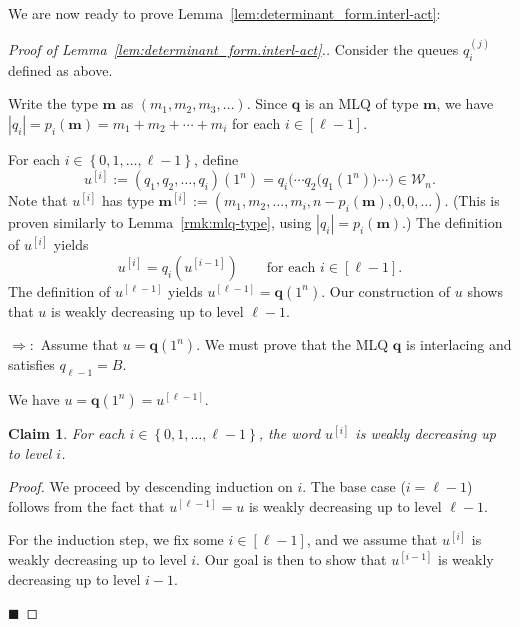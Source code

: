\documentclass[reqno]{amsart}
\newcommand{\0}{\phantom{c}}
\newcommand{\mm}{\mathbf{m}}
\newcommand{\qq}{\mathbf{q}}
\newcommand{\mcW}{\mathcal{W}}
\newenvironment{subproof}{\textit{Proof.} }{\hfill$\blacksquare$ \medskip}
\newcommand{\set}[1]{\left\{ #1 \right\}}
\newcommand{\abs}[1]{\left| #1 \right|}
\newcommand{\tup}[1]{\left( #1 \right)}
\newcommand{\ive}[1]{\left[ #1 \right]}
\theoremstyle{plain}
\newtheorem{claim}[thm]{Claim}
\theoremstyle{definition}
\numberwithin{equation}{section}
\begin{document}
We are now ready to prove Lemma~\ref{lem:determinant_form.interl-act}:

\begin{proof}[Proof of Lemma~\ref{lem:determinant_form.interl-act}.]
Consider the queues $q_i^{(j)}$ defined as above.

Write the type $\mm$ as $\tup{m_1, m_2, m_3, \ldots}$.
Since $\qq$ is an MLQ of type $\mm$, we have $\abs{q_i} = p_i(\mm) = m_1 + m_2 + \cdots + m_i$ for each $i \in \ive{\ell-1}$.

For each $i \in \set{0, 1, \dotsc, \ell-1}$, define
\[
u^{\left[  i\right]} := (q_1, q_2, \dotsc, q_i)(1^n)  = q_i\bigl( \cdots q_2\bigl( q_1(1^n) \bigr) \cdots \bigr)  \in \mcW_n .
\]
Note that $u^{\left[  i\right]  }$ has type $\mm^{[i]} := \tup{m_1, m_2, \dotsc, m_i, n-p_i(\mm), 0, 0, \ldots}$.
(This is proven similarly to Lemma~\ref{rmk:mlq-type}, using $\abs{q_i} = p_i(\mm)$.)
The definition of $u^{\left[  i\right]  }$ yields
\begin{equation}
\label{pf.lem:determinant_form.interl-act.rec}
u^{\left[  i\right]} = q_i\left(  u^{\left[  i-1\right]  }\right) \qquad \text{for each } i \in \ive{\ell-1}.
\end{equation}
The definition of $u^{\left[  \ell-1\right]  }$ yields $u^{\left[\ell-1\right]} = \qq(1^n)$.
Our construction of $u$ shows that $u$ is weakly decreasing up to level $\ell-1$.

$\Longrightarrow:$
Assume that $u = \qq(1^n)$.
We must prove that the MLQ $\qq$ is interlacing and satisfies $q_{\ell-1} = B$.

We have $u = \qq(1^n) = u^{\left[  \ell-1\right]  }$.

\begin{claim}
\label{claim:weakly_decreasing_level_i}
For each $i \in \set{0, 1, \dotsc, \ell-1} $, the word $u^{\left[  i\right]  }$ is weakly decreasing up to level $i$.
\end{claim}

\begin{subproof}
We proceed by descending induction on $i$.
The base case ($i=\ell-1$) follows from the fact that $u^{\left[  \ell-1\right]} = u$ is weakly decreasing up to level $\ell-1$.

For the induction step, we fix some $i \in \ive{\ell-1}$, and we assume that $u^{\left[i\right]}$ is weakly decreasing up to level $i$.
Our goal is then to show that $u^{\left[i-1\right]}$ is weakly decreasing up to level $i-1$.


\end{subproof}
\end{proof}
\end{document}
